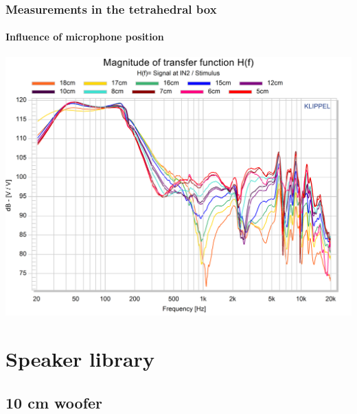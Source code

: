 \documentclass{report}
\begin{document}
\begin{appendices}
\subsection{Measurements in the tetrahedral box}

\subsubsection{Influence of microphone position}
\label{Curves:InfluMicPos}


\begin{center}	
	\includegraphics[scale=0.76,angle=90]{RoomComp/MicPos_TRF} 
	\captionsetup{hypcap=false} 
	\label{fig:micpos_TRF_big}
\end{center}


\chapter{Speaker library}
\label{chap:spk_lib}

\section{10 cm woofer}
\label{spkrlib:10cm}


\end{appendices}
\end{document}
